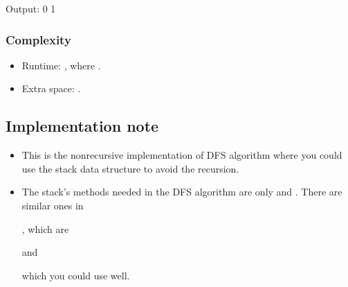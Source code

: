 \documentclass[letterpaper,12pt,english]{book}
\begin{document}
\begin{sphinxVerbatim}[commandchars=\\\{\}]
Output:
0
1
\end{sphinxVerbatim}


\subsubsection{Complexity}
\label{\detokenize{Graph/785_Is_Graph_Bipartite:complexity}}\begin{itemize}
\item {} 
\sphinxAtStartPar
Runtime: , where .

\item {} 
\sphinxAtStartPar
Extra space: .

\end{itemize}


\subsection{Implementation note}
\label{\detokenize{Graph/785_Is_Graph_Bipartite:implementation-note}}\begin{itemize}
\item {} 
\sphinxAtStartPar
This is the non\sphinxhyphen{}recursive implementation of DFS algorithm where you could use the stack data structure to avoid the recursion.

\item {} 
\sphinxAtStartPar
The stack’s methods needed in the DFS algorithm are only  and . There are similar ones in %
\begin{footnote}[71]\sphinxAtStartFootnote
{}
%
\end{footnote}, which are %
\begin{footnote}[72]\sphinxAtStartFootnote
{}
%
\end{footnote} and %
\begin{footnote}[73]\sphinxAtStartFootnote
{}
%
\end{footnote} which you could use well.

\end{itemize}
\end{document}
